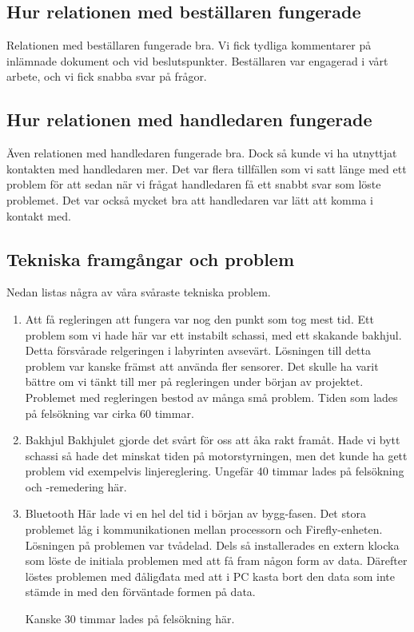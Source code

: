 \documentclass[a4paper,12pt]{article}
\begin{document}
\subsection{Hur relationen med beställaren fungerade}
Relationen med beställaren fungerade bra. Vi fick tydliga kommentarer på inlämnade dokument och vid beslutspunkter. Beställaren var engagerad
i vårt arbete, och vi fick snabba svar på frågor. 

\subsection{Hur relationen med handledaren fungerade}
Även relationen med handledaren fungerade bra. Dock så kunde vi ha utnyttjat kontakten med handledaren mer. Det var flera tillfällen som vi
satt länge med ett problem för att sedan när vi frågat handledaren få ett snabbt svar som löste problemet. Det var också mycket bra att handledaren 
var lätt att komma i kontakt med. 

\subsection{Tekniska framgångar och problem}
Nedan listas några av våra svåraste tekniska problem. 

\begin{enumerate}
\item Att få regleringen att fungera var nog den punkt som tog mest tid. 
Ett problem som vi hade här var ett instabilt schassi, med ett skakande bakhjul. Detta försvårade relgeringen i labyrinten avsevärt. 
Lösningen till detta problem var kanske främst att använda fler sensorer. Det skulle ha varit bättre om vi tänkt till mer på regleringen 
under början av projektet. 
Problemet med regleringen bestod av många små problem. Tiden som lades på felsökning var cirka 60 timmar. 

\item Bakhjul
Bakhjulet gjorde det svårt för oss att åka rakt framåt. Hade vi bytt schassi så hade det minskat tiden på motorstyrningen, 
men det kunde ha gett problem vid exempelvis linjereglering. 
Ungefär 40 timmar lades på felsökning och -remedering här. 

\item Bluetooth
Här lade vi en hel del tid i början av bygg-fasen. Det stora problemet låg i kommunikationen mellan processorn och Firefly-enheten. 
Lösningen på problemen var tvådelad. Dels så installerades en extern klocka som löste de initiala problemen med att få fram någon 
form av data. Därefter löstes problemen med \"dålig\" data med att i PC kasta bort den data som inte stämde in med den förväntade formen
på data.  

Kanske 30 timmar lades på felsökning här. 
\end{enumerate}
\end{document}

